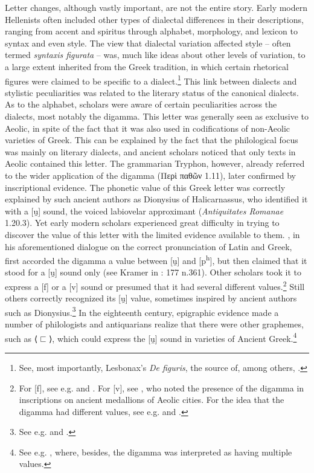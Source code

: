 Letter changes, although vastly important, are not the entire story. Early modern Hellenists often included other types of dialectal differences in their descriptions, ranging from accent and spiritus through alphabet, morphology, and lexicon to syntax and even style. The view that dialectal variation affected style – often termed \textit{syntaxis figurata} – was, much like ideas about other levels of variation, to a large extent inherited from the Greek tradition, in which certain rhetorical figures were claimed to be specific to a dialect.\footnote{{See, most importantly, Lesbonax’s} {\textit{De figuris}}{, the source of, among others, \citet[145--146]{Saumaise1643a}.}} This link between dialects and stylistic peculiarities was related to the literary status of the canonical dialects. As to the alphabet, scholars were aware of certain peculiarities across the dialects, most notably the digamma. This letter was generally seen as exclusive to Aeolic, in spite of the fact that it was also used in codifications of non-Aeolic varieties of Greek. This can be explained by the fact that the philological focus was mainly on literary dialects, and ancient scholars noticed that only texts in Aeolic contained this letter. The grammarian Tryphon, however, already referred to the wider application of the digamma (Περὶ παθῶν 1.11), later confirmed by inscriptional evidence. The phonetic value of this Greek letter was correctly explained by such ancient authors as Dionysius of Halicarnassus, who identified it with a [u̯] sound, the voiced labiovelar approximant (\textit{Antiquitates Romanae} 1.20.3). Yet early modern scholars experienced great difficulty in trying to discover the value of this letter with the limited evidence available to them. \citet[68–69, 108]{Erasmus1528}, in his aforementioned dialogue on the correct pronunciation of Latin and Greek, first accorded the digamma a value between [u̯] and [p\textsuperscript{h}], but then claimed that it stood for a [u̯] sound only (see Kramer in \citealt{Erasmus1978}: 177 n.361). Other scholars took it to express a [f] or a [v] sound or presumed that it had several different values.\footnote{{For [f], see e.g. \citet[4]{Sylvius1531} and \citet[5]{Rhenius1626}. For [v], see \citet[108-109]{Freret1809}, who noted the presence of the digamma in inscriptions on ancient medallions of Aeolic cities. For the idea that the digamma had different values, see e.g. \citet[107-108]{Canini1555} and \citet[b.1{\textsc{\textsuperscript{r}}}{–b.2}{\textsc{\textsuperscript{v}}}]{ThryllitschBrunner1709}.}} Still others correctly recognized its [u̯] value, sometimes inspired by ancient authors such as Dionysius.\footnote{{See e.g. \citet[b.4{\textsc{\textsuperscript{r}}}]{KirchmaierCrusius1684} and \citet[19]{Reynolds1752}.}} In the eighteenth century, epigraphic evidence made a number of philologists and antiquarians realize that there were other graphemes, such as ⟨$⊏$⟩, which could express the [u̯] sound in varieties of Ancient Greek.\footnote{{See e.g. \citet[128-130]{Mazzocchi1754}, where, besides, the digamma was interpreted as having multiple values.}}



